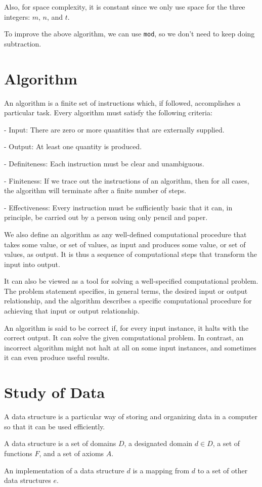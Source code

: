 Also, for space complexity, it is constant since we only use space for the three integers: \(m\), \(n\), and \(t\). 

To improve the above algorithm, we can use \verb|mod|, so we don't need to keep doing subtraction.

\section{Algorithm}
An algorithm is a finite set of instructions which, if followed, accomplishes a particular task. Every algorithm must satisfy the following criteria:

- Input: There are zero or more quantities that are externally supplied.

- Output: At least one quantity is produced.

- Definiteness: Each instruction must be clear and unambiguous.

- Finiteness: If we trace out the instructions of an algorithm, then for all cases, the algorithm will terminate after a finite number of steps.

- Effectiveness: Every instruction must be sufficiently basic that it can, in principle, be carried out by a person using only pencil and paper. 

We also define an algorithm as any well-defined computational procedure that takes some value, or set of values, as input and produces some value, or set of values, as output. It is thus a sequence of computational steps that transform the input into output.

It can also be viewed as a tool for solving a well-specified computational problem. The problem statement specifies, in general terms, the desired input or output relationship, and the algorithm describes a specific computational procedure for achieving that input or output relationship.

An algorithm is said to be correct if, for every input instance, it halts with the correct output. It can solve the given computational problem. In contrast, an incorrect algorithm might not halt at all on some input instances, and sometimes it can even produce useful results.

\section{Study of Data}
A data structure is a particular way of storing and organizing data in a computer so that it can be used efficiently.

A data structure is a set of domains \(D\), a designated domain \(d \in D\), a set of functions \(F\), and a set of axioms \(A\).

An implementation of a data structure \(d\) is a mapping from \(d\) to a set of other data structures \(e\).
